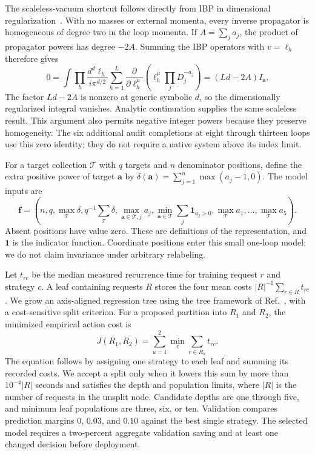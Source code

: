 The scaleless-vacuum shortcut follows directly from IBP in dimensional regularization~\cite{ChetyrkinTkachov,Weinzierl2022}. With no masses or external momenta, every inverse propagator is homogeneous of degree two in the loop momenta. If $A=\sum_j a_j$, the product of propagator powers has degree $-2A$. Summing the IBP operators with $v=\ell_h$ therefore gives
\begin{equation}
 0=\int\prod_h\frac{d^d\ell_h}{i\pi^{d/2}}
 \sum_{h=1}^{L}\frac{\partial}{\partial\ell_h^\mu}
 \left(\ell_h^\mu\prod_j D_j^{-a_j}\right)
 =(Ld-2A)I_{\boldsymbol a}.
 \label{eq:fast-scaleless}
\end{equation}
The factor $Ld-2A$ is nonzero at generic symbolic $d$, so the dimensionally regularized integral vanishes. Analytic continuation supplies the same scaleless result. This argument also permits negative integer powers because they preserve homogeneity. The six additional audit completions at eight through thirteen loops use this zero identity; they do not require a native system above its index limit.

For a target collection $\mathcal T$ with $q$ targets and $n$ denominator positions, define the extra positive power of target $\boldsymbol a$ by $\delta(\boldsymbol a)=\sum_{j=1}^{n}\max(a_j-1,0)$. The model inputs are
\begin{equation}
 \boldsymbol f=\left(n,q,\max_{\mathcal T}\delta,
 q^{-1}\sum_{\mathcal T}\delta,
 \max_{\boldsymbol a\in\mathcal T,j}a_j,
 \min_{\boldsymbol a\in\mathcal T}\sum_j\mathbf1_{a_j>0},
 \max_{\mathcal T}a_1,\ldots,\max_{\mathcal T}a_5\right).
 \label{eq:fast-features}
\end{equation}
Absent positions have value zero. These are definitions of the representation, and $\mathbf1$ is the indicator function. Coordinate positions enter this small one-loop model; we do not claim invariance under arbitrary relabeling.

Let $t_{rc}$ be the median measured recurrence time for training request $r$ and strategy $c$. A leaf containing requests $R$ stores the four mean costs $|R|^{-1}\sum_{r\in R}t_{rc}$. We grow an axis-aligned regression tree using the tree framework of Ref.~\cite{CART1984}, with a cost-sensitive split criterion. For a proposed partition into $R_1$ and $R_2$, the minimized empirical action cost is
\begin{equation}
 J(R_1,R_2)=\sum_{u=1}^{2}\min_c\sum_{r\in R_u}t_{rc}.
 \label{eq:fast-tree-loss}
\end{equation}
The equation follows by assigning one strategy to each leaf and summing its recorded costs. We accept a split only when it lowers this sum by more than $10^{-4}|R|$ seconds and satisfies the depth and population limits, where $|R|$ is the number of requests in the unsplit node. Candidate depths are one through five, and minimum leaf populations are three, six, or ten. Validation compares prediction margins $0$, $0.03$, and $0.10$ against the best single strategy. The selected model requires a two-percent aggregate validation saving and at least one changed decision before deployment.

